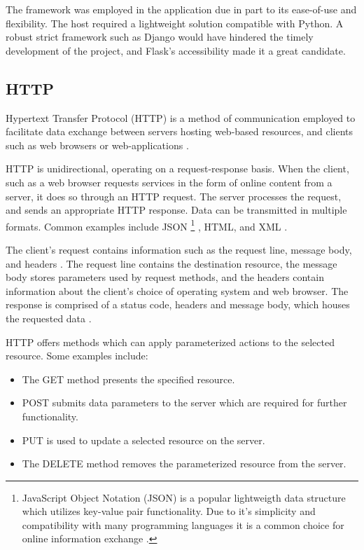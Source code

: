 \documentclass{thesis-ekf}
\theoremstyle{definition}
\theoremstyle{remark}
\begin{document}
{The framework was employed in the application due in part to its ease-of-use and flexibility. The host required a lightweight solution compatible with Python. A robust strict framework such as Django would have hindered the timely development of the project, and Flask's accessibility made it a great candidate.   

\subsection{HTTP} \label{sub-http}
Hypertext Transfer Protocol (HTTP) is a method of communication employed to facilitate data exchange between servers hosting web-based resources, and clients such as web browsers or web-applications \cite{mdn-http}.

HTTP is unidirectional, operating on a request-response basis. When the client, such as a web browser requests services in the form of online content from a server, it does so through an HTTP request. The server processes the request, and sends an appropriate HTTP response. Data can be transmitted in multiple formats. Common examples include JSON 
 \footnote{JavaScript Object Notation (JSON) is a popular lightweigth data structure which utilizes key-value pair functionality. Due to it's simplicity and compatibility with many programming languages it is a common choice for online information exchange \cite{mdn-json}.}
, HTML, and XML \cite{wiki-http}.

The client's request contains information such as the request line, message body, and headers \cite{req-head}. The request line contains the destination resource, the message body stores parameters used by request methods, and the headers contain information about the client's choice of operating system and web browser. The response is comprised of a status code, headers and message body, which houses the requested data \cite{wiki-http}.

HTTP offers methods which can apply parameterized actions to the selected resource. Some examples include:
\begin{itemize}
	\item The GET method presents the specified resource. 
	\item POST submits data parameters to the server which are required for further functionality.
	\item PUT is used to update a selected resource on the server.
	\item The DELETE method removes the parameterized resource from the server.
\end{itemize}

}
\end{document}
